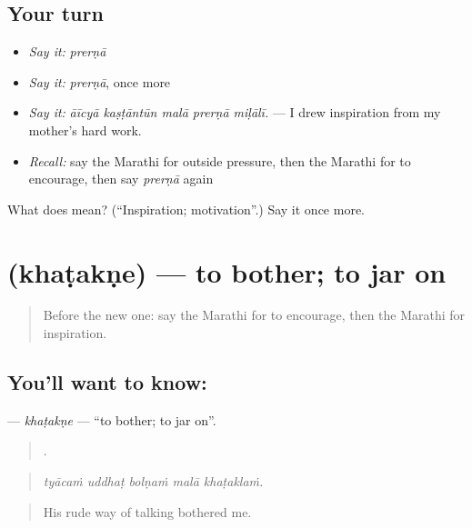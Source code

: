 \subsection*{Your turn}
\begin{itemize}
\raggedright
  \item \emph{Say it:} \emph{prerṇā}
  \item \emph{Say it:} \emph{prerṇā}, once more
  \item \emph{Say it:} \emph{āīcyā kaṣṭāntūn malā prerṇā miḷālī.} — I drew inspiration from my mother's hard work.
  \item \emph{Recall:} say the Marathi for outside pressure, then the Marathi for to encourage, then say \emph{prerṇā} again
\end{itemize}

\begin{tcolorbox}[breakable,colback=teal!4,colframe=teal!35!black,title={Before you move on}]
What does  mean? (\textquotedblleft{}Inspiration; motivation\textquotedblright{}.) Say it once more.
\end{tcolorbox}
\section[\texorpdfstring{\mr{खटकणे} (khaṭakṇe)}{खटकणे (khaṭakṇe)}]{ (khaṭakṇe) — to bother; to jar on}

\label{lesson:MR-C377-khatakne}



\begin{quote}
Before the new one: say the Marathi for to encourage, then the Marathi for inspiration.
\end{quote}

\subsection*{You'll want to know: }
\textbf{} — \emph{khaṭakṇe} — \textquotedblleft{}to bother; to jar on\textquotedblright{}.

\begin{quote}
    .
\end{quote}

\begin{quote}
\emph{tyācaṁ uddhaṭ bolṇaṁ malā khaṭaklaṁ.}
\end{quote}

\begin{quote}
His rude way of talking bothered me.
\end{quote}

